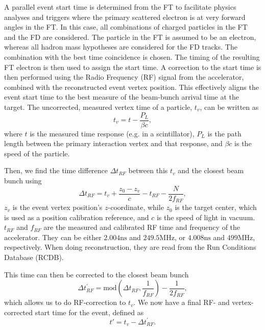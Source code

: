     A parallel event start time is determined from the FT to facilitate physics analyses and triggers where the primary scattered electron is at very forward angles in the FT.
    In this case, all combinations of charged particles in the FT and the FD are considered.
    The particle in the FT is assumed to be an electron, whereas all hadron mass hypotheses are considered for the FD tracks.
    The combination with the best time coincidence is chosen.
    The timing of the resulting FT electron is then used to assign the start time.
    A correction to the start time is then performed using the Radio Frequency (RF) signal from the accelerator, combined with the reconstructed event vertex position.
    This effectively aligns the event start time to the best measure of the beam-bunch arrival time at the target.
    The uncorrected, measured vertex time of a particle, $t_v$, can be written as
    \begin{equation*}
        t_v = t - \frac{P_L}{\beta c},
    \end{equation*}
    where $t$ is the measured time response (e.g. in a scintillator), $P_L$ is the path length between the primary interaction vertex and that response, and $\beta c$ is the speed of the particle.

    Then, we find the time difference $\Delta t_{RF}$ between this $t_v$ and the closest beam bunch using
    \begin{equation*}
        \Delta t_{RF} = t_v + \frac{z_0 - z_v}{c} - t_{RF} - \frac{N}{2f_{RF}},
    \end{equation*}
    $z_v$ is the event vertex position's $z$-coordinate, while $z_0$ is the target center, which is used as a position calibration reference, and $c$ is the speed of light in vacuum.
    $t_{RF}$ and $f_{RF}$ are the measured and calibrated RF time and frequency of the accelerator.
    They can be either $2.004 \text{ns}$ and $249.5 \text{MHz}$, or $4.008 \text{ns}$ and $499 \text{MHz}$, respectively.
    When doing reconstruction, they are read from the Run Conditions Database (RCDB).

    This time can then be corrected to the closest beam bunch
    \begin{equation*}
        \Delta t^\prime_{RF} = \text{mod}\left(\Delta t_{RF}, \frac{1}{f_{RF}}\right) - \frac{1}{2f_{RF}},
    \end{equation*}
    which allows us to do RF-correction to $t_v$.
    We now have a final RF- and vertex-corrected start time for the event, defined as
    \begin{equation*}
        t' = t_v - \Delta t^\prime_{RF}.
    \end{equation*}

